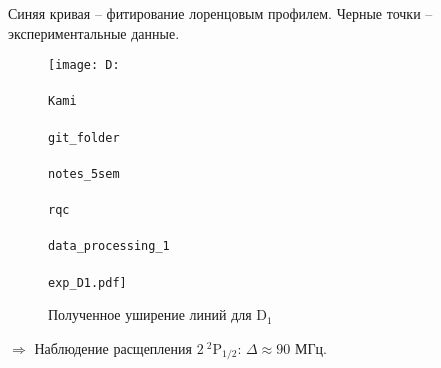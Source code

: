 Синяя кривая -- фитирование лоренцовым профилем.
Черные точки -- экспериментальные данные.

\begin{figure}[h]
    \centering
    \texttt{[image: D:\\\\Kami\\\\git\_folder\\\\notes\_5sem\\\\rqc\\\\data\_processing\_1\\\\exp\_D1.pdf]}
    \caption{Полученное уширение линий для D${}_1$}
    \label{fig:expD1}
\end{figure}

\vspace{-2mm}
$\Rightarrow$ Наблюдение расщепления $2 \ {}^2\text{P}_{1/2}$: $\Delta \approx 90$ МГц.